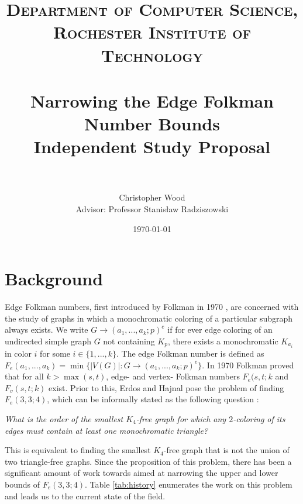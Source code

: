 \documentclass[paper=a4, fontsize=11pt]{scrartcl} %
\title{	
\normalfont \normalsize 
\textsc{Department of Computer Science, Rochester Institute of Technology} \\ [25pt] %
\horrule{2pt} \\[0.4cm] %
\huge Narrowing the Edge Folkman Number Bounds \\ 
\Large Independent Study Proposal \\
\horrule{2pt} \\[0.5cm] %
}
\author{Christopher Wood \\ Advisor: Professor Stanis{\l}aw Radziszowski} %
\date{\normalsize\today} %
\begin{document}
\maketitle %

\section{Background}
Edge Folkman numbers, first introduced by Folkman in 1970 \cite{Folkman}, are concerned
with the study of graphs in which a monochromatic coloring of a particular subgraph always exists. 
We write $G \to (a_1, ..., a_k; p)^e$ if for ever edge coloring of an undirected simple graph $G$ not 
containing $K_p$, there exists a monochromatic $K_{a_{i}}$ in color $i$ for some $i \in \{1, ..., k\}$. 
The edge Folkman number is defined as $F_e(a_1, ..., a_k) = \min\{|V(G)| : G \to (a_1, ..., a_k; p)^e\}$.
In 1970 Folkman proved that for all $k > \max(s,t)$, edge- and vertex- Folkman numbers $F_e(s,t;k$
and $F_v(s,t;k)$ exist. Prior to this, Erdos and Hajnal pose the problem of finding $F_e(3,3;4)$, which
can be informally stated as the following question \cite{Erdos01}: 

\noindent \emph{What is the order of the smallest $K_4$-free graph for which any $2$-coloring of 
its edges must contain at least one monochromatic triangle?}

This is equivalent to finding the smallest $K_4$-free graph that is not the union of two 
triangle-free graphs. Since the proposition of this problem, there has been a significant
amount of work towards aimed at narrowing the upper and lower bounds of $F_e(3,3;4)$. 
Table \ref{tab:history} enumerates the work on this problem and leads us to the 
current state of the field.
\end{document}
